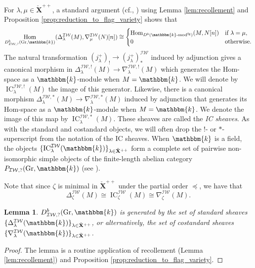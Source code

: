 \documentclass{amsart}
\renewcommand{\k}{\mathbbm{k}}
\newcommand{\bfXv}{\check{\mathbf{X}}}
\newcommand{\IW}{\mathcal{IW}}
\DeclareMathOperator{\Hom}{Hom}
\renewcommand{\mod}[1]{#1\textnormal{-mod}}
\DeclareMathOperator{\IC}{IC}
\DeclareMathOperator{\Gr}{Gr}
\DeclareMathOperator{\fg}{fg}
\newtheorem{lemma}[subsubsection]{Lemma}
\theoremstyle{definition}
\begin{document}
    For $\lambda, \mu \in \bfXv^{++}$, a standard argument (cf., \cite[\S 3.3]{BGS}) using Lemma \ref{lem:recollement} and Proposition \ref{prop:reduction_to_flag_variety} shows that
    \begin{equation}\label{eq:hom_std_costd}
        \Hom_{D_{\IW, ?}^b (\Gr, \k)} (\Delta_{\lambda}^{\IW} (M), \nabla_{\mu}^{\IW} (N) [n]) \cong \begin{cases} \Hom_{D^b (\mod{\k}^{\fg})} (M, N [n]) & \text{if }\lambda = \mu, \\ 0 & \text{otherwise.}\end{cases}
    \end{equation}    
    The natural transformation $(j_{\lambda}^{+})_! \to (j_{\lambda}^{+})_*^{\IW}$ induced by adjunction gives a canonical morphism in $\Delta_{\lambda}^{\IW, !} (M) \to \nabla_{\lambda}^{\IW, !} (M)$ which generates the Hom-space as a $\k$-module when $M = \k$.
    We will denote by $\IC_{\lambda}^{\IW, !} (M)$ the image of this generator. 
    Likewise, there is a canonical morphism $\Delta_{\lambda}^{\IW, *} (M) \to \nabla_{\lambda}^{\IW, *} (M)$ induced by adjunction that generates its Hom-space as a $\k$-module when $M = \k$.
    We denote the image of this map by $\IC_{\lambda}^{\IW, *} (M)$. 
    These sheaves are called the \emph{IC sheaves}.
    As with the standard and costandard objects, we will often drop the $!$- or $*$-superscript from the notation of the IC sheaves. 
    When $\k$ is a field, the objects $\{\IC_{\lambda}^{\IW} (\k)\}_{\lambda \in \bfXv^{++}}$ form a complete set of pairwise non-isomorphic  simple objects of the finite-length abelian category $P_{\IW, ?} (\Gr ,\k)$ (see \cite[Proposition 1.4.26]{BBD}).

    Note that since $\zeta$ is minimal in $\bfXv^{++}$ under the partial order $\preceq$, we have that 
    \begin{equation}\label{eq:min_IC_clean}
    \Delta_{\zeta}^{\IW} (M) \cong \IC_{\zeta}^{\IW} (M) \cong \nabla_{\zeta}^{\IW} (M).
    \end{equation}

    \begin{lemma}\label{lem:std_costds_generate}
        $D_{\IW, ?}^b (\Gr, \k)$ is generated by the set of standard sheaves $\{ \Delta_{\lambda}^{\IW} (\k) \}_{\lambda \in \bfXv^{++}}$, or alternatively, the set of costandard sheaves $\{ \nabla_{\lambda}^{\IW} (\k) \}_{\lambda \in \bfXv^{++}}$.
    \end{lemma}
    \begin{proof}
        The lemma is a routine application of recollement (Lemma \ref{lem:recollement}) and Proposition \ref{prop:reduction_to_flag_variety}.
    \end{proof}
\end{document}

